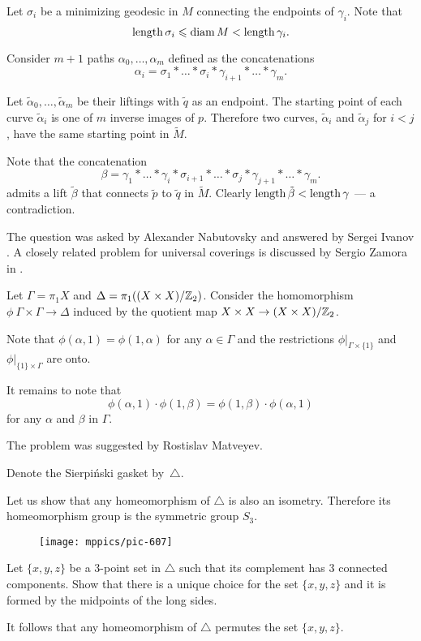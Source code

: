Let $\sigma_i$ be a minimizing geodesic in $M$ connecting the endpoints of $\gamma_i$. 
Note that 
\[\operatorname{\rm length}\sigma_i\leqslant \operatorname{\rm diam}\nolimits M< \operatorname{\rm length}\gamma_i.\] 

Consider $m+1$ paths $\alpha_0,\dots,\alpha_m$ defined as the concatenations 
\[\alpha_i=\sigma_1{*}\dots{*}\sigma_i{*}\gamma_{i+1}{*}\dots{*}\gamma_m.\]

Let $\tilde\alpha_0,\dots,\tilde\alpha_m$ be their liftings
with $\tilde q$ as an endpoint.
The starting point of each curve $\tilde\alpha_i$ is one of $m$ inverse images of $p$. 
Therefore two curves, $\tilde\alpha_i$ and $\tilde\alpha_j$ for $i<j$, 
have the same starting point in $\tilde M$.

Note that the concatenation
\[\beta=\gamma_1{*}\dots{*}\gamma_i{*}\sigma_{i+1}{*}\dots{*}\sigma_j{*}\gamma_{j+1}{*}\dots{*}\gamma_m.\]
admits a lift $\tilde\beta$ that connects $\tilde p$ to $\tilde q$ in $\tilde M$.
Clearly $\operatorname{\rm length} \tilde\beta<\operatorname{\rm length} \gamma$ --- a contradiction.
\qeds

The question was asked by Alexander  Nabutovsky
and answered by Sergei Ivanov \cite{ivanov}.
A closely related problem for universal coverings is discussed by Sergio Zamora in \cite{zamora}.



Let $\Gamma=\pi_1 X$ and $\Delta=\pi_1((X\times X)/\mathbb{Z}_2)$.
Consider the homomorphism $\phi\:\Gamma\times \Gamma\to \Delta$
induced by the quotient map $X\times X\z\to (X\times X)/\ZZ_2$.

Note that $\phi(\alpha,1)=\phi(1,\alpha)$ for any $\alpha\in \Gamma$ and the restrictions $\phi|_{\Gamma\times \{1\}}$ and $\phi|_{\{1\}\times\Gamma}$
are onto.

It remains to note that 
$$\phi(\alpha,1)\cdot\phi(1,\beta)=\phi(1,\beta)\cdot\phi(\alpha,1)$$
for any $\alpha$ and $\beta$ in $\Gamma$.
\qeds

 
The problem was suggested by Rostislav Matveyev.




Denote the Sierpi\'nski gasket by~$\triangle$.

Let us show that any homeomorphism of $\triangle$ is also an isometry.
Therefore its homeomorphism group is the symmetric group $S_3$. 

{

\begin{wrapfigure}{o}{23 mm}
\vskip-4mm
\centering
\texttt{[image: mppics/pic-607]}
\end{wrapfigure}
Let $\{x,y,z\}$ be a 3-point set in $\triangle$ such that its complement has 3 connected components.
Show that there is a unique choice for the set $\{x,y,z\}$ and 
it is formed by the midpoints of the long sides.

It follows that any homeomorphism of $\triangle$ permutes the set $\{x,y,z\}$.

}

